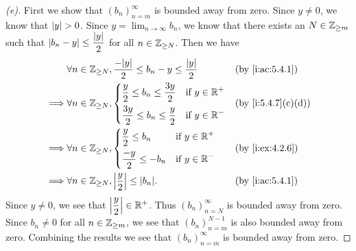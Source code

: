 \begin{proof}[(e)]
  First we show that \((b_n)_{n = m}^\infty\) is bounded away from zero.
  Since \(y \neq 0\), we know that \(\left\lvert y\right\rvert > 0\).
  Since \(y = \lim_{n \to \infty} b_n\), we know that there exists an \(N \in \mathbb{Z}_{\geq m}\) such that \(\left\lvert b_n - y\right\rvert \leq \dfrac{\left\lvert y\right\rvert}{2}\) for all \(n \in \mathbb{Z}_{\geq N}\).
  Then we have
  \begin{align*}
             & \forall n \in \Z_{\geq N}, \dfrac{-\abs{y}}{2} \leq b_n - y \leq \dfrac{\abs{y}}{2} &  & \by{i:ac:5.4.1} \\
    \implies & \forall n \in \Z_{\geq N}, \begin{dcases}
                                            \dfrac{y}{2} \leq b_n \leq \dfrac{3y}{2} & \text{if } y \in \R^+ \\
                                            \dfrac{3y}{2} \leq b_n \leq \dfrac{y}{2} & \text{if } y \in \R^-
                                          \end{dcases}                 &  & \by{i:5.4.7}[c,d]              \\
    \implies & \forall n \in \Z_{\geq N}, \begin{dcases}
                                            \dfrac{y}{2} \leq b_n   & \text{if } y \in \R^+ \\
                                            \dfrac{-y}{2} \leq -b_n & \text{if } y \in \R^-
                                          \end{dcases}                                  &  & \by{i:ex:4.2.6}            \\
    \implies & \forall n \in \Z_{\geq N}, \abs{\dfrac{y}{2}} \leq \abs{b_n}.                       &  & \by{i:ac:5.4.1}
  \end{align*}
  Since \(y \neq 0\), we see that \(\left\lvert\dfrac{y}{2}\right\rvert \in \mathbb{R}^+\).
  Thus \((b_n)_{n = N}^\infty\) is bounded away from zero.
  Since \(b_n \neq 0\) for all \(n \in \mathbb{Z}_{\geq m}\), we see that \((b_n)_{n = m}^{N - 1}\) is also bounded away from zero.
  Combining the results we see that \((b_n)_{n = m}^\infty\) is bounded away from zero.


\end{proof}
